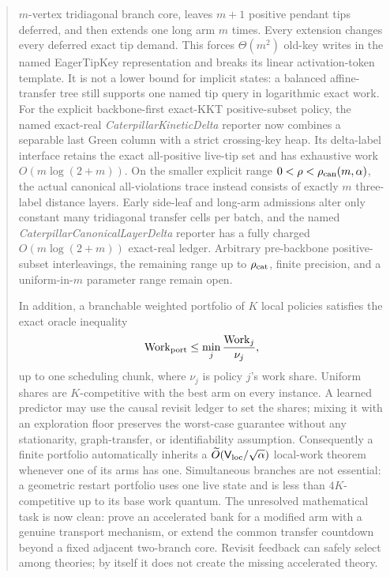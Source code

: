 \documentclass[11pt]{article}
\begin{document}
\begin{abstract}
$m$-vertex tridiagonal branch core, leaves $m+1$ positive pendant tips
deferred, and then extends one long arm $m$ times.
Every extension changes every deferred exact tip demand.  This forces
$\Theta(m^2)$ old-key writes in the named EagerTipKey representation and
breaks its linear activation-token template.  It is not a lower bound for
implicit states: a balanced affine-transfer tree still supports one named
tip query in logarithmic exact work.  For the explicit backbone-first
exact-KKT positive-subset policy, the named exact-real
\emph{CaterpillarKineticDelta}
reporter now combines a separable last Green column with a strict crossing-key
heap.  Its delta-label interface retains the exact all-positive live-tip set
and has exhaustive work $O(m\log(2+m))$.  On the smaller explicit range
$0<\rho<\rho_{\rm can}(m,\alpha)$, the actual canonical all-violations trace
instead consists of exactly $m$ three-label distance layers.  Early side-leaf
and long-arm admissions alter only constant many tridiagonal transfer cells
per batch, and the named \emph{CaterpillarCanonicalLayerDelta} reporter has a
fully charged $O(m\log(2+m))$ exact-real ledger.  Arbitrary pre-backbone
positive-subset interleavings, the remaining range up to $\rho_{\rm cat}$,
finite precision, and a uniform-in-$m$ parameter range remain open.

In addition, a branchable weighted portfolio of $K$ local policies satisfies
the exact oracle inequality
\[
 \operatorname{Work}_{\rm port}
 \leq \min_j \frac{\operatorname{Work}_j}{\nu_j},
\]
up to one scheduling chunk, where $\nu_j$ is policy $j$'s work share.
Uniform shares are $K$-competitive with the best arm on every instance.  A
learned predictor may use the causal revisit ledger to set the shares; mixing
it with an exploration floor preserves the worst-case guarantee without any
stationarity, graph-transfer, or identifiability assumption.  Consequently a
finite portfolio automatically inherits a
$\widetilde O(\mathsf V_{\rm loc}/\sqrt\alpha)$ local-work theorem whenever one of its arms has
one.  Simultaneous branches are not essential: a geometric restart portfolio
uses one live state and is less than $4K$-competitive up to its base work
quantum.  The unresolved mathematical task is now clean: prove an accelerated
bank for a modified arm with a genuine transport mechanism, or extend the
common transfer countdown beyond a fixed adjacent two-branch core.  Revisit
feedback can safely select among theories; by itself it does not create the
missing accelerated theory.
\end{abstract}
\end{document}
